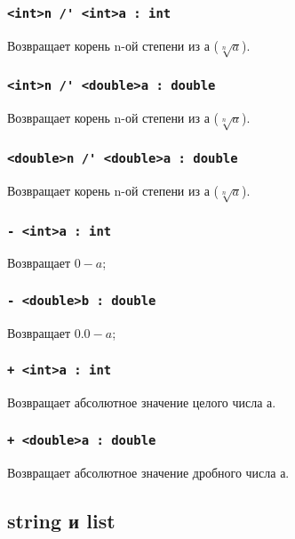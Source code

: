 \documentclass[a4paper, 14pt]{extarticle}
\begin{document}
\subsubsection{\lstinline`<int>n /' <int>a : int`}
	Возвращает корень n-ой степени из а ($\sqrt[n]{a}$).

\subsubsection{\lstinline`<int>n /' <double>a : double`}
	Возвращает корень n-ой степени из а ($\sqrt[n]{a}$).

\subsubsection{\lstinline`<double>n /' <double>a : double`}
	Возвращает корень n-ой степени из а ($\sqrt[n]{a}$).


\subsubsection{\lstinline`- <int>a : int`}
	Возвращает $0-a$;

\subsubsection{\lstinline`- <double>b : double`}
	Возвращает $0.0-a$;

\subsubsection{\lstinline`+ <int>a : int`}
	Возвращает абсолютное значение целого числа а.

\subsubsection{\lstinline`+ <double>a : double`}
	Возвращает абсолютное значение дробного числа а.

\subsection{{\color{bluemarin}string} и {\color{bluemarin}list}}
\end{document}
